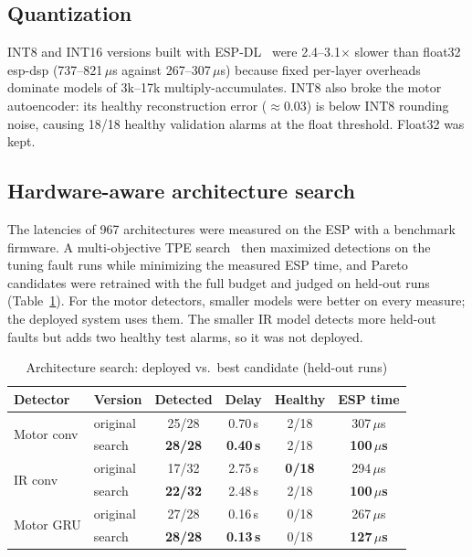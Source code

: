 \documentclass[conference]{IEEEtran}
\begin{document}
\subsection{Quantization}
INT8 and INT16 versions built with ESP-DL~\cite{espdl} were 2.4--3.1$\times$
slower than float32 esp-dsp (737--821\,$\mu$s against 267--307\,$\mu$s) because
fixed per-layer overheads dominate models of 3k--17k multiply-accumulates. INT8
also broke the motor autoencoder: its healthy reconstruction error ($\approx$0.03)
is below INT8 rounding noise, causing 18/18 healthy validation alarms at the
float threshold. Float32 was kept.

\subsection{Hardware-aware architecture search}
The latencies of 967 architectures were measured on the ESP with a benchmark
firmware. A multi-objective TPE search~\cite{optuna} then maximized detections
on the tuning fault runs while minimizing the measured ESP time, and Pareto
candidates were retrained with the full budget and judged on held-out runs
(Table~\ref{tab:search}). For the motor detectors, smaller models were better on
every measure; the deployed system uses them. The smaller IR model detects more
held-out faults but adds two healthy test alarms, so it was not deployed.

\begin{table}[t]
\caption{Architecture search: deployed vs.\ best candidate (held-out runs)}
\label{tab:search}
\centering
\footnotesize
\setlength{\tabcolsep}{3.2pt}
\begin{tabular}{@{}llcccc@{}}
\toprule
Detector & Version & Detected & Delay & Healthy & ESP time \\
\midrule
\multirow{2}{*}{Motor conv} & original & 25/28 & 0.70\,s & 2/18 & 307\,$\mu$s \\
 & search & \textbf{28/28} & \textbf{0.40\,s} & 2/18 & \textbf{100\,$\mu$s} \\
\multirow{2}{*}{IR conv} & original & 17/32 & 2.75\,s & \textbf{0/18} & 294\,$\mu$s \\
 & search & \textbf{22/32} & 2.48\,s & 2/18 & \textbf{100\,$\mu$s} \\
\multirow{2}{*}{Motor GRU} & original & 27/28 & 0.16\,s & 0/18 & 267\,$\mu$s \\
 & search & \textbf{28/28} & \textbf{0.13\,s} & 0/18 & \textbf{127\,$\mu$s} \\
\bottomrule
\end{tabular}
\end{table}
\end{document}
